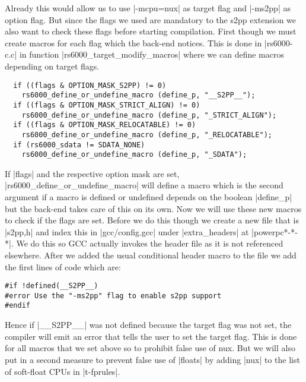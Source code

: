 Already this would allow us to use |-mcpu=nux| as target flag and |-ms2pp| as option flag.
But since the flags we used are mandatory to the s2pp extension we also want to check these flags before starting compilation.
First though we must create macros for each flag which the back-end notices.
This is done in |rs6000-c.c| in function |rs6000_target_modify_macros| where we can define macros depending on target flags.
\begin{lstlisting}
  if ((flags & OPTION_MASK_S2PP) != 0)
    rs6000_define_or_undefine_macro (define_p, "__S2PP__");
  if ((flags & OPTION_MASK_STRICT_ALIGN) != 0)
    rs6000_define_or_undefine_macro (define_p, "_STRICT_ALIGN");
  if ((flags & OPTION_MASK_RELOCATABLE) != 0)
    rs6000_define_or_undefine_macro (define_p, "_RELOCATABLE");
  if (rs6000_sdata != SDATA_NONE)
    rs6000_define_or_undefine_macro (define_p, "_SDATA");
\end{lstlisting}

If |flags| and the respective option mask are set, |rs6000_define_or_undefine_macro| will define a macro which is the second argument if a macro is defined or undefined depends on the boolean |define_p| but the back-end takes care of this on its own.
Now we will use these new macros to check if the flags are set.
Before we do this though we create a new file that is |s2pp,h| and index this in |gcc/config.gcc| under |extra_headers| at |powerpc*-*-*|.
We do this so GCC actually invokes the header file as it is not referenced elsewhere.
After we added the usual conditional header macro to the file we add the first lines of code which are:
\begin{lstlisting}
#if !defined(__S2PP__)
#error Use the "-ms2pp" flag to enable s2pp support
#endif
\end{lstlisting}
Hence if |__S2PP__| was not defined because the target flag was not set, the compiler will emit an error that tells the user to set the target flag.
This is done for all macros that we set above so to prohibit false use of nux.
But we will also put in a second measure to prevent false use of |floats| by adding |nux| to the list of soft-float CPUs in |t-fprules|.


